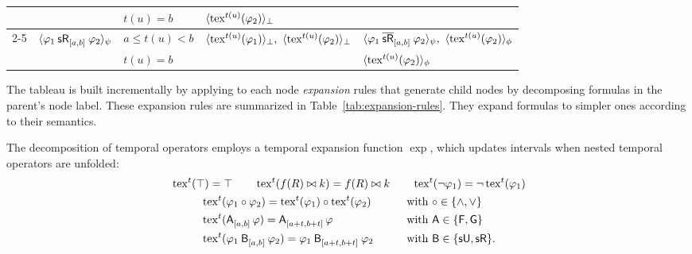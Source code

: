 \documentclass{easychair}
\begin{document}
\begin{table}
\begin{tabular}{c l l l l}
            &
            & $t(u)=b$
            & $\parof{\exp^{t(u)}(\varphi_2)}{\bot}$
            & \\
    
        \cmidrule(lr){2-5}
    
            & \multirow{2}{*}{$\parof{\srelease{[a,b]}{\varphi_1}{\varphi_2}}{\psi}$}
            & $a \le t(u) < b$
            & $\parof{\exp^{t(u)}(\varphi_1)}{\bot},\ \parof{\exp^{t(u)}(\varphi_2)}{\bot}$
            & $\parof{\msrelease{[a,b]}{\varphi_1}{\varphi_2}}{\psi},\ \parof{\exp^{t(u)}(\varphi_2)}{\phi}$ \\
        
            &
            & $t(u)=b$
            & 
            & $\parof{\exp^{t(u)}(\varphi_2)}{\phi}$ \\
    
        \bottomrule
    \end{tabular}
\end{table}

The tableau is built incrementally by applying to each node \emph{expansion} rules that generate child nodes by decomposing formulas in the parent's node label.
These expansion rules are summarized in Table~\ref{tab:expansion-rules}.
They expand formulas to simpler ones according to their semantics.

The decomposition of temporal operators employs a temporal expansion function $\exp$, which updates intervals when nested temporal operators are unfolded:
\begin{gather*}
    \begin{alignedat}{3}
        &\exp^t(\top) = \top &\qquad
        &\exp^t(f(R) \bowtie k) = f(R) \bowtie k &\qquad
        &\exp^t(\neg \varphi_1) = \neg \exp^t(\varphi_1)
    \end{alignedat} \\
    \begin{aligned}
        &\exp^t(\varphi_1 \circ \varphi_2) = \exp^t(\varphi_1) \circ \exp^t(\varphi_2) &\qquad& \text{with } \circ \in \set{\land, \lor} \\
        &\exp^t(\anyunop{[a,b]}{\varphi}) = \anyunop{[a+t,b+t]}{\varphi} &\qquad& \text{with } \mathsf{A} \in \set{\evenop, \globop} \\
        &\exp^t(\anybinop{[a,b]}{\varphi_1}{\varphi_2}) = \anybinop{[a+t,b+t]}{\varphi_1}{\varphi_2} &\qquad& \text{with } \mathsf{B} \in \set{\suntilop, \sreleaseop}.
    \end{aligned}
\end{gather*}
\end{document}
